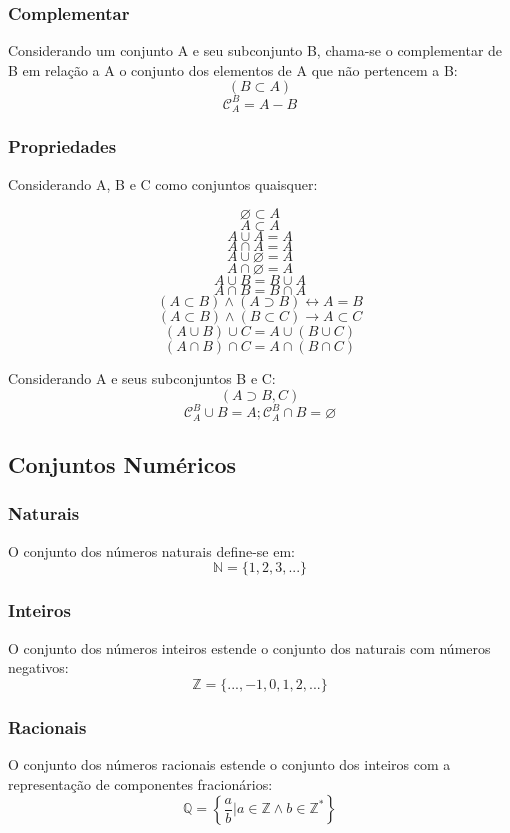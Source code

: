     \subsubsection{Complementar}
        Considerando um conjunto A e seu subconjunto B, chama-se o complementar de B em relação a A o conjunto dos elementos de A que não pertencem a B:
        \[ (B \subset A) \]
        \[ \mathcal{C}^{B}_{A} = A - B \]
    \subsubsection{Propriedades}
        Considerando A, B e C como conjuntos quaisquer:
        \begin{multicols}{3}
            \noindent\[ \varnothing \subset A \]
            \[ A \subset A \]
            \[ A \cup A = A \]
            \[ A \cap A = A \]
            \[ A \cup \varnothing = A \]
            \[ A \cap \varnothing = A \]
            \[ A \cup B = B \cup A \]
            \[ A \cap B = B \cap A \]
            \[ (A \subset B) \wedge (A \supset B) \leftrightarrow A = B \]
            \[ (A \subset B) \wedge (B \subset C) \rightarrow A \subset C \]
            \[ (A \cup B) \cup C = A \cup (B \cup C) \]
            \[ (A \cap B) \cap C = A \cap (B \cap C) \]
        \end{multicols}
        Considerando A e seus subconjuntos B e C:
        \[ (A \supset B,C) \]
        \[ \mathcal{C}^{B}_{A} \cup B = A; \mathcal{C}^{B}_{A} \cap B = \varnothing \]
\subsection{Conjuntos Numéricos}
    \subsubsection{Naturais}
        O conjunto dos números naturais define-se em:
        \[ \mathbb{N} = \{ 1,2,3,... \} \]
    \subsubsection{Inteiros}
        O conjunto dos números inteiros estende o conjunto dos naturais com números negativos:
        \[ \mathbb{Z} = \{ ...,-1,0,1,2,... \} \]
    \subsubsection{Racionais}
        O conjunto dos números racionais estende o conjunto dos inteiros com a representação de componentes fracionários:
        \[ \mathbb{Q} = \left\{\frac{a}{b} | a \in \mathbb{Z} \wedge b \in \mathbb{Z}^* \right\} \]

